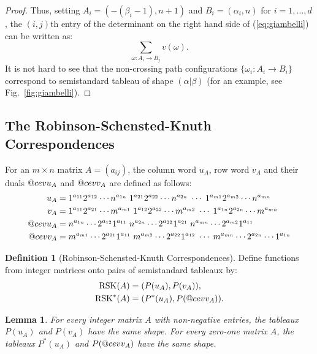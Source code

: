 \documentclass[11pt]{amsproc}
\makeatletter
\DeclareRobustCommand{\cev}[1]{%
  \mathpalette\do@cev{#1}%
}
\newcommand{\do@cev}[2]{%
  \fix@cev{#1}{+}%
  \reflectbox{$\m@th#1\vec{\reflectbox{$\fix@cev{#1}{-}\m@th#1#2\fix@cev{#1}{+}$}}$}%
  \fix@cev{#1}{-}%
}
\newcommand{\fix@cev}[2]{%
  \ifx#1\displaystyle
    \mkern#23mu
  \else
    \ifx#1\textstyle
      \mkern#23mu
    \else
      \ifx#1\scriptstyle
        \mkern#22mu
      \else
        \mkern#22mu
      \fi
    \fi
  \fi
}
\newtheorem{lemma}[theorem]{Lemma}
\theoremstyle{definition}
\newtheorem{definition}[theorem]{Definition}
\theoremstyle{example}
\newcommand{\rsk}{\textup{RSK}}
\makeatother
\begin{document}
\begin{proof}
  Thus, setting $A_i=(-(\beta_i-1),n+1)$ and $B_i=(\alpha_i,n)$ for $i=1,\dotsc,d$, 
  the $(i,j)$th entry of the determinant on the right hand side of (\ref{eq:giambelli}) can be written as:
  \begin{equation}
    \label{eq:giambelli-det}
    \sum_{\omega:A_i\to B_j} v(\omega).
  \end{equation}
  It is not hard to see that the non-crossing path configurations $\{\omega_i:A_i\to B_i\}$ correspond to semistandard tableau of shape $(\alpha|\beta)$ (for an example, see Fig.~\ref{fig:giambelli}).
\end{proof}
\subsection{The Robinson-Schensted-Knuth Correspondences}
\label{sec:rsk}
For an $m\times n$ matrix $A=(a_{ij})$, the column word $u_A$, row word $v_A$ and their duals $\cev u_A$ and $\cev v_A$ are defined as follows:
\begin{align*}
  u_A &= 1^{a_{11}}2^{a_{12}}\dotsb n^{a_{1n}} \; 1^{a_{21}} 2^{a_{22}} \dotsb n^{a_{2n}} \; \dotsb \; 1^{a_{m1}} 2^{a_{m2}} \dotsb n^{a_{mn}}\\
  v_A &= 1^{a_{11}}2^{a_{21}}\dotsb m^{a_{m1}} \; 1^{a_{12}} 2^{a_{22}} \dotsb m^{a_{m2}} \; \dotsb \; 1^{a_{1n}} 2^{a_{2n}} \dotsb m^{a_{mn}}\\
  \cev u_A &= n^{a_{1n}} \dotsb 2^{a_{12}}1^{a_{11}}\; n^{a_{2n}}\dotsb 2^{a_{22}}1^{a_{21}} \; n^{a_{mn}} \dotsb 2^{a_{m2}} 1^{a_{11}}\\
  \cev v _A &= m^{a_{m1}}\dotsb 2^{a_{21}}1^{a_{11}} \; m^{a_{m2}}\dotsb 2^{a_{22}} 1^{a_{12}} \; \dotsb \; m^{a_{mn}}\dotsb  2^{a_{2n}} \dotsb 1^{a_{1n}}
\end{align*}
\begin{definition}
  [Robinson-Schensted-Knuth Correspondences]
  Define functions from integer matrices onto pairs of semistandard tableaux by:
  \begin{align*}
    \rsk(A) & = (P(u_A), P(v_A)),\\
    \rsk^*(A) & = (P^*(u_A), P(\cev v_A)).
  \end{align*}
\end{definition}
\begin{lemma}
  \label{lemma:same_shape}
  For every integer matrix $A$ with non-negative entries, the tableaux $P(u_A)$ and $P(v_A)$ have the same shape.
  For every zero-one matrix $A$, the tableaux $P^*(u_A)$ and $P(\cev v_A)$ have the same shape.
\end{lemma}
\end{document}
